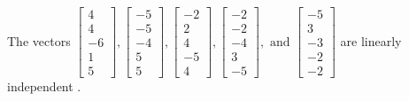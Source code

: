 \begin{exercise}
\begin{exerciseStatement}
  \end{exerciseStatement}
  \begin{exerciseAnswer}
   The vectors \(\left[\begin{array}{r}
4 \\
4 \\
-6 \\
1 \\
5
\end{array}\right] , \left[\begin{array}{r}
-5 \\
-5 \\
-4 \\
5 \\
5
\end{array}\right] , \left[\begin{array}{r}
-2 \\
2 \\
4 \\
-5 \\
4
\end{array}\right] , \left[\begin{array}{r}
-2 \\
-2 \\
-4 \\
3 \\
-5
\end{array}\right] , \text{ and } \left[\begin{array}{r}
-5 \\
3 \\
-3 \\
-2 \\
-2
\end{array}\right]\) are 
  	 linearly independent  .
  


  \end{exerciseAnswer}
\end{exercise}